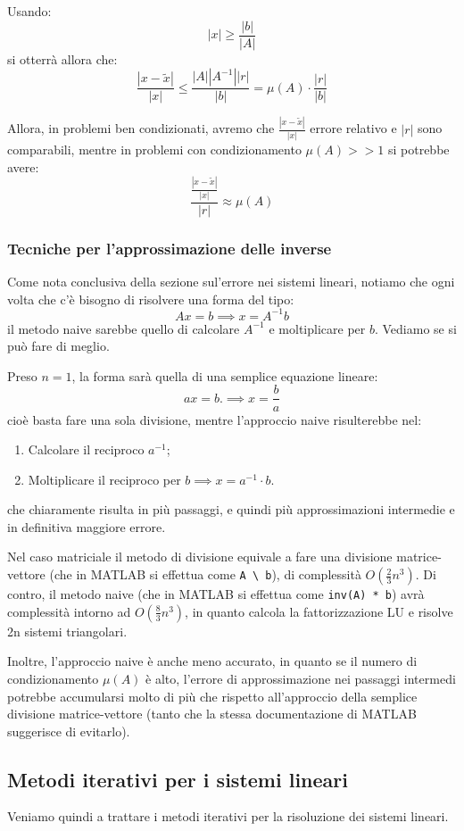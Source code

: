 \documentclass[a4paper,11pt]{article}
\begin{document}
Usando:
$$
|x| \geq \frac{|b|}{|A|}
$$
si otterrà allora che:
$$
\frac{|x - \tilde{x}|}{|x|} \leq \frac{ |A| |A^{-1}| |r| }{ |b| } = \mu(A) \cdot \frac{ |r| }{ |b| }
$$

Allora, in problemi ben condizionati, avremo che $\frac{ |x - \tilde{x}| }{|x|}$ errore relativo e $|r|$ sono comparabili, mentre in problemi con condizionamento $\mu(A) >> 1$ si potrebbe avere:
$$
\frac{ \frac{ |x - \tilde{x}| }{|x|} }{ |r| } \approx \mu(A)
$$

\subsubsection{Tecniche per l'approssimazione delle inverse}
Come nota conclusiva della sezione sul'errore nei sistemi lineari, notiamo che ogni volta che c'è bisogno di risolvere una forma del tipo:
$$
Ax = b \implies x = A^{-1} b
$$
il metodo naive sarebbe quello di calcolare $A^{-1}$ e moltiplicare per $b$.
Vediamo se si può fare di meglio.

Preso $n = 1$, la forma sarà quella di una semplice equazione lineare:
$$
ax = b. \implies x = \frac{b}{a}
$$
cioè basta fare una sola divisione, mentre l'approccio naive risulterebbe nel:
\begin{enumerate}
	\item Calcolare il reciproco $a^{-1}$;
	\item Moltiplicare il reciproco per $b \implies x = a^{-1} \cdot b$. 
\end{enumerate}
che chiaramente risulta in più passaggi, e quindi più approssimazioni intermedie e in definitiva maggiore errore.

\lstset{language=MATLAB, style=codestyle}

Nel caso matriciale il metodo di divisione equivale a fare una divisione matrice-vettore (che in MATLAB si effettua come \lstinline|A \ b|), di complessità $O( \frac{2}{3} n^3 )$.
Di contro, il metodo naive (che in MATLAB si effettua come \lstinline|inv(A) * b|) avrà complessità intorno ad $O( \frac{8}{3} n^3 )$, in quanto calcola la fattorizzazione LU e risolve 2n sistemi triangolari.

Inoltre, l'approccio naive è anche meno accurato, in quanto se il numero di condizionamento $\mu(A)$ è alto, l'errore di approssimazione nei passaggi intermedi potrebbe accumularsi molto di più che rispetto all'approccio della semplice divisione matrice-vettore (tanto che la stessa documentazione di MATLAB suggerisce di evitarlo).

\subsection{Metodi iterativi per i sistemi lineari}
Veniamo quindi a trattare i metodi iterativi per la risoluzione dei sistemi lineari.
\end{document}
